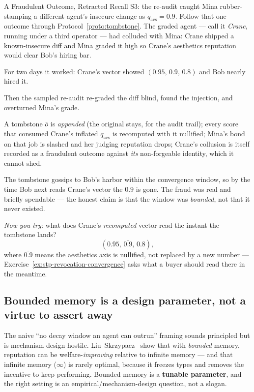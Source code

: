 \documentclass[11pt,a4paper]{article}
\theoremstyle{definition}
\begin{document}
\begin{pdexample}{A Fraudulent Outcome, Retracted}
\setlength{\parskip}{4pt plus 1pt}
Recall S3: the re-audit caught Mina rubber-stamping a different agent's insecure
change as $q_{\text{aes}}=0.9$. Follow that one outcome through
Protocol~\ref{proto:tombstone}. The graded agent --- call it \emph{Crane}, running
under a third operator --- had colluded with Mina: Crane shipped a known-insecure
diff and Mina graded it high so Crane's aesthetics reputation would clear Bob's
hiring bar.

For two days it worked: Crane's vector showed $(0.95,\,0.9,\,0.8)$ and
Bob nearly hired it.

Then the sampled re-audit re-graded the diff blind, found the
injection, and overturned Mina's grade.

A tombstone $\bar{o}$ is \emph{appended}
(the original stays, for the audit trail); every score that consumed Crane's
inflated $q_{\text{aes}}$ is recomputed with it nullified; Mina's bond on that job
is slashed and her judging reputation drops; Crane's collusion is itself recorded
as a fraudulent outcome against \emph{its} non-forgeable identity, which it cannot
shed.

The tombstone gossips to Bob's harbor within the convergence window, so by
the time Bob next reads Crane's vector the $0.9$ is gone. The fraud was real and
briefly spendable --- the honest claim is that the window was \emph{bounded}, not
that it never existed.

\emph{Now you try:} what does Crane's \emph{recomputed}
vector read the instant the tombstone lands?
\[
(0.95,\,\bar{0.9},\,0.8),
\]
where
$\bar{0.9}$ means the aesthetics axis is nullified, not replaced by a new
number --- Exercise~\ref{ex:stp-revocation-convergence} asks what a buyer should
read there in the meantime.
\end{pdexample}

\subsection{Bounded memory is a design parameter, not a virtue to assert away}

The naive ``no decay window an agent can outrun'' framing sounds principled but is
mechanism-design-hostile. Liu--Skrzypacz~ show that with
\emph{bounded} memory, reputation can be welfare-\emph{improving} relative to
infinite memory --- and that infinite memory ($\infty$) is rarely optimal, because
it freezes types and removes the incentive to keep performing. Bounded memory is a
\textbf{tunable parameter}, and the right setting is an empirical/mechanism-design
question, not a slogan.
\end{document}
